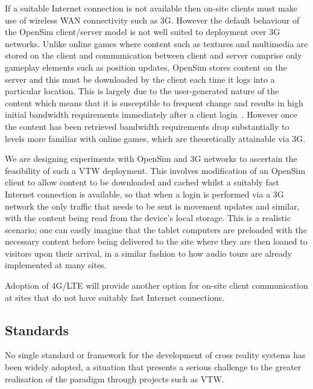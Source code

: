 \documentclass[conference,a4paper]{IEEEtran}
\begin{document}
If a suitable Internet connection is not available then on-site clients must make use of wireless WAN connectivity such as 3G. However the default behaviour of the OpenSim client/server model is not well suited to deployment over 3G networks. Unlike online games where content such as textures and multimedia are stored on the client and communication between client and server comprise only gameplay elements such as position updates, OpenSim stores content on the server and this must be downloaded by the client each time it logs into a particular location. This is largely due to the user-generated nature of the content which means that it is susceptible to frequent change and results in high initial bandwidth requirements immediately after a client login~\cite{Bainbridge2007, Oliver2010}. However once the content has been retrieved bandwidth requirements drop substantially to levels more familiar with online games, which are theoretically attainable via 3G.

We are designing experiments with OpenSim and 3G networks to ascertain the feasibility of such a VTW deployment. This involves modification of an OpenSim client to allow content to be downloaded and cached whilst a suitably fast Internet connection is available, so that when a login is performed via a 3G network the only traffic that needs to be sent is movement updates and similar, with the content being read from the device's local storage. This is a realistic scenario; one can easily imagine that the tablet computers are preloaded with the necessary content before being delivered to the site where they are then loaned to visitors upon their arrival, in a similar fashion to how audio tours are already implemented at many sites.

Adoption of 4G/LTE will provide another option for on-site client communication at sites that do not have suitably fast Internet connections.

\subsection{Standards}
\label{subsec:standards}
No single standard or framework for the development of cross reality systems has been widely adopted, a situation that presents a serious challenge to the greater realisation of the paradigm through projects such as VTW.
\end{document}
